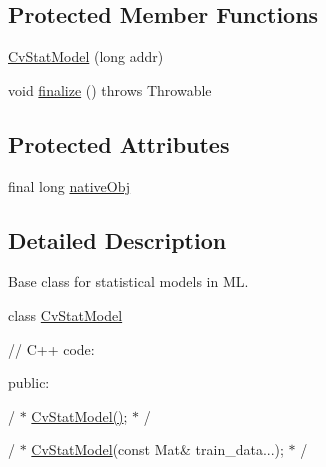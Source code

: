 \subsection*{Protected Member Functions}
\begin{DoxyCompactItemize}
\item 
\mbox{\hyperlink{classorg_1_1opencv_1_1ml_1_1_cv_stat_model_a9b196b1edff5a2616dbc574505274848}{Cv\+Stat\+Model}} (long addr)
\item 
void \mbox{\hyperlink{classorg_1_1opencv_1_1ml_1_1_cv_stat_model_a367b6d9b41e7ebbe5f960e8b7c480a26}{finalize}} ()  throws Throwable 
\end{DoxyCompactItemize}
\subsection*{Protected Attributes}
\begin{DoxyCompactItemize}
\item 
final long \mbox{\hyperlink{classorg_1_1opencv_1_1ml_1_1_cv_stat_model_a61dd522c3b9e472bffe468f00d53ca50}{native\+Obj}}
\end{DoxyCompactItemize}


\subsection{Detailed Description}
Base class for statistical models in ML.

class \mbox{\hyperlink{classorg_1_1opencv_1_1ml_1_1_cv_stat_model}{Cv\+Stat\+Model}} {\ttfamily }

{\ttfamily }

{\ttfamily }

{\ttfamily // C++ code\+:}

{\ttfamily }

{\ttfamily }

{\ttfamily public\+:}

{\ttfamily }

{\ttfamily }

{\ttfamily / $\ast$ \mbox{\hyperlink{classorg_1_1opencv_1_1ml_1_1_cv_stat_model_a9b196b1edff5a2616dbc574505274848}{Cv\+Stat\+Model()}}; $\ast$ /}

{\ttfamily }

{\ttfamily }

{\ttfamily / $\ast$ \mbox{\hyperlink{classorg_1_1opencv_1_1ml_1_1_cv_stat_model}{Cv\+Stat\+Model}}(const Mat\& train\+\_\+data...); $\ast$ /}

{\ttfamily }

